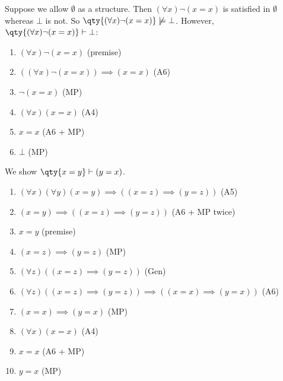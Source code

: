 \begin{remark}
    Suppose we allow $\emptyset$ as a structure.
    Then $(\forall x) \neg (x = x)$ is satisfied in $\emptyset$ whereas $\bot$ is not.
    So $\qty{(\forall x) \neg (x = x)} \not\models \bot$.
    However, $\qty{(\forall x) \neg (x = x)} \vdash \bot$:
    \begin{enumerate}
        \item $(\forall x) \neg (x = x)$ (premise)
        \item $((\forall x) \neg (x = x)) \implies (x=x)$ (A6)
        \item $\neg (x = x)$ (MP)
        \item $(\forall x) (x = x)$ (A4)
        \item $x = x$ (A6 + MP)
        \item $\bot$ (MP)
    \end{enumerate}
\end{remark}

\begin{example}
    We show $\qty{x = y} \vdash (y = x)$.
    \begin{enumerate}
        \item $(\forall x) (\forall y) (x = y) \implies ((x = z) \implies (y = z))$ (A5)
        \item $(x = y) \implies ((x = z) \implies (y = z))$ (A6 + MP twice)
        \item $x = y$ (premise)
        \item $(x = z) \implies (y = z)$ (MP)
        \item $(\forall z) ((x = z) \implies (y = z))$ (Gen)
        \item $(\forall z) ((x = z) \implies (y = z)) \implies ((x = x) \implies (y = x))$ (A6)
        \item $(x = x) \implies (y = x)$ (MP)
        \item $(\forall x) (x = x)$ (A4)
        \item $x = x$ (A6 + MP)
        \item $y = x$ (MP)
    \end{enumerate}
\end{example}

